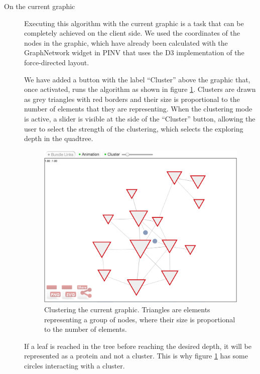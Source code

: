 \begin{description}
\item[On the current graphic]
Executing this algorithm with the current graphic is a task that can be completely achieved on the client side. We used the coordinates of the nodes in the graphic, which have already been calculated with the GraphNetwork widget in PINV that uses the D3 implementation of the force-directed layout. 

We have added a button with the label ``Cluster'' above the graphic that, once activated, runs the algorithm as shown in figure \ref{fig:local_cluster}. Clusters are drawn as grey triangles with red borders and their size is proportional to the number of elements that they are representing. When the clustering mode is active, a slider is visible at the side of the ``Cluster'' button, allowing the user to select the strength of the clustering, which selects the exploring depth in the quadtree.

\begin{figure}[ht]
\centering
\includegraphics[width=\textwidth]{figures/local_cluster.png}
\caption[Clustering the current graphic.]{Clustering the current graphic. Triangles are elements representing a group of nodes, where their size is proportional to the number of elements.
\label{fig:local_cluster}}
\end{figure}

If a leaf is reached in the tree before reaching the desired depth, it will be represented as a protein and not a cluster. This is why figure \ref{fig:local_cluster} has some circles interacting with a cluster.


\end{description}
